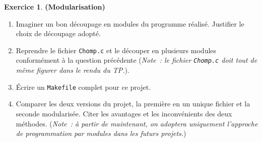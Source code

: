 \documentclass[12pt]{article}
\theoremstyle{definition}
\newtheorem{Exercice}{Exercice}
\begin{document}
\begin{Exercice} {\bf (Modularisation)}\smallskip
\label{ex:4}

\begin{enumerate}
    \item Imaginer un bon découpage en modules du programme réalisé. 
    Justifier le choix de découpage adopté.
    \smallskip
    
    \item Reprendre le fichier {\tt Chomp.c} et le découper en plusieurs
    modules conformément à la question précédente ({\it Note~: le fichier 
    {\tt Chomp.c} doit tout de même figurer dans le rendu du TP.}).
    \smallskip
    
    \item Écrire un {\tt Makefile} complet pour ce projet.
    \smallskip
    
    \item Comparer les deux versions du projet, la première en un unique 
    fichier et la seconde modularisée. Citer les avantages et les 
    inconvénients des deux méthodes. ({\it Note~: à partir de maintenant, 
    on adoptera uniquement l'approche de programmation par modules dans 
    les futurs projets.})
\end{enumerate}
\end{Exercice}
\bigskip
\end{document}
